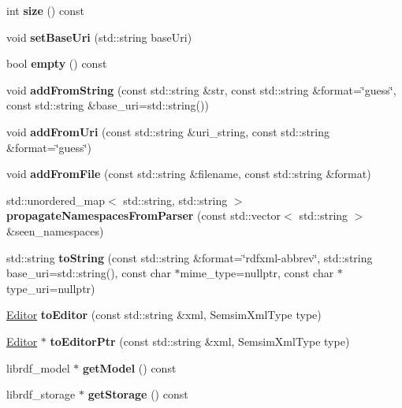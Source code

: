 \begin{DoxyCompactItemize}
int {\bfseries size} () const
\item 
\mbox{\label{classsemsim_1_1RDF_a6bbd8747ca3893339162bbb00e9f428f}} 
void {\bfseries set\+Base\+Uri} (std\+::string base\+Uri)
\item 
\mbox{\label{classsemsim_1_1RDF_ac90c8d0c73127e851825e1426ce9622e}} 
bool {\bfseries empty} () const
\item 
\mbox{\label{classsemsim_1_1RDF_a3a920ea30103f06343d4714987a2b765}} 
void {\bfseries add\+From\+String} (const std\+::string \&str, const std\+::string \&format=\char`\"{}guess\char`\"{}, const std\+::string \&base\+\_\+uri=std\+::string())
\item 
\mbox{\label{classsemsim_1_1RDF_a27497273858cca1463a612f92f332da1}} 
void {\bfseries add\+From\+Uri} (const std\+::string \&uri\+\_\+string, const std\+::string \&format=\char`\"{}guess\char`\"{})
\item 
\mbox{\label{classsemsim_1_1RDF_a8cd65868da05f409c37b91acdbf33aa0}} 
void {\bfseries add\+From\+File} (const std\+::string \&filename, const std\+::string \&format)
\item 
\mbox{\label{classsemsim_1_1RDF_a493ffd6ebc12adc6c668f04f21ce2380}} 
std\+::unordered\+\_\+map$<$ std\+::string, std\+::string $>$ {\bfseries propagate\+Namespaces\+From\+Parser} (const std\+::vector$<$ std\+::string $>$ \&seen\+\_\+namespaces)
\item 
\mbox{\label{classsemsim_1_1RDF_a762cc1d30484cd95b130526e2fab9ef3}} 
std\+::string {\bfseries to\+String} (const std\+::string \&format=\char`\"{}rdfxml-\/abbrev\char`\"{}, std\+::string base\+\_\+uri=std\+::string(), const char $\ast$mime\+\_\+type=nullptr, const char $\ast$type\+\_\+uri=nullptr)
\item 
\mbox{\label{classsemsim_1_1RDF_acf46cf3b2dbfa5828dac1e823cf972c8}} 
\hyperlink{classsemsim_1_1Editor}{Editor} {\bfseries to\+Editor} (const std\+::string \&xml, Semsim\+Xml\+Type type)
\item 
\mbox{\label{classsemsim_1_1RDF_a1f6a4f82d01c93be36eb5c986c1629bc}} 
\hyperlink{classsemsim_1_1Editor}{Editor} $\ast$ {\bfseries to\+Editor\+Ptr} (const std\+::string \&xml, Semsim\+Xml\+Type type)
\item 
\mbox{\label{classsemsim_1_1RDF_ac8286394b938d0511e7ccbf81583277c}} 
librdf\+\_\+model $\ast$ {\bfseries get\+Model} () const
\item 
\mbox{\label{classsemsim_1_1RDF_a92ace04b947ccd8c7c3c90a4d9d77edb}} 
librdf\+\_\+storage $\ast$ {\bfseries get\+Storage} () const
\end{DoxyCompactItemize}
